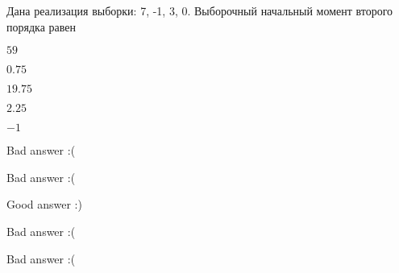 
\begin{question}
Дана реализация выборки: 7, -1, 3, 0. Выборочный начальный момент
второго порядка равен
\begin{answerlist}
  \item \(59\)
  \item \(0.75\)
  \item \(19.75\)
  \item \(2.25\)
  \item \(-1\)
\end{answerlist}
\end{question}

\begin{solution}
\begin{answerlist}
  \item Bad answer :(
  \item Bad answer :(
  \item Good answer :)
  \item Bad answer :(
  \item Bad answer :(
\end{answerlist}
\end{solution}

